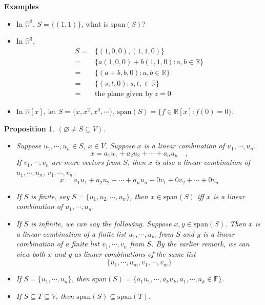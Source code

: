 \documentclass[12pt]{article}
\theoremstyle{plain}
\newtheorem{proposition}{Proposition}[subsection]
\newcommand{\Span}{\mathrm{span}}
\let\emptyset\varnothing
\begin{document}
	{\color{Brown}
		\textbf{Examples}
		\begin{itemize}
			\item In $\mathbb{R}^2$, $S = \{(1,1)\}$, what is $\Span(S)$?
			
			\item In $\mathbb{R}^3$, 
				\begin{align*}
					S =& \{(1,0,0), (1,1,0)\} \\
					=& \{a(1,0,0)+b(1,1,0): a,b \in \mathbb{R}\} \\
					=&\{(a+b, b ,0):a,b\in\mathbb{R}\} \\
					=&\{(s,t,0):s,t,\in \mathbb{R}\} \\
					=& \text{the plane given by} \ z = 0 
				\end{align*}
				
			\item In $\mathbb{R}[x]$, let $S = \{x,x^2,x^3,\cdots\}$,
				$\Span(S) = \{f\in\mathbb{R}[x]: f(0)=0\}$.\\
		\end{itemize}
	}
	
	\begin{proposition}
		$(\emptyset \neq S\subseteq V)$. 
		\begin{itemize}
			\item Suppose $u_1,\cdots,u_n \in S$, $x\in V$. 
				Suppose $x$ is a linear combination of $u_1,\cdots, u_n$.
				\[
					x = a_1u_1 + a_2u_2 + \cdots + a_nu_n \quad , 
				\]
				If $v_1,\cdots, v_n$ are more vectors from $S$, 
				then $x$ is also a linear combination of 
				$u_1,\cdots,u_n$, $v_1,\cdots, v_n$.
				\[
					x = a_1u_1 + a_2u_2 + \cdots + a_nu_n + 0 v_1+ 0 v_2+
					\cdots + 0v_n
				\]

			\item 
				If $S$ is finite, say $S = \{u_1, u_2, \cdots, u_n\}$, then
				$x \in \Span(S)$ iff $x$ is a linear combination of $u_1, 
				\cdots, u_n$. 

			\item 
				If $S$ is infinite, we can say the following. 
				Suppose $x, y \in \Span(S)$. Then $x$ is a linear combination
				of a finite list $u_1, \cdots, u_m$ from $S$ and $y$ is a 
				linear combination of a finite list $v_1, \cdots, v_n$ from 
				$S$. By the earlier remark, we can view both $x$ and $y$ as
				linaer combinations of the same list
				\[
					\{u_1, \cdots, u_m, v_1, \cdots, v_m\}
				\]

			\item If $S = \{u_1, \cdots, u_n\}$, then 
				$\Span(S) = \{a_1u_1,\cdots, a_ku_k, 
				a_1,\cdots, a_k\in\mathbb{F}\}$.

			\item If $S \subseteq T \subseteq V$, then
				$\Span(S) \subseteq \Span(T)$. 
		\end{itemize}
	\end{proposition}
\end{document}
